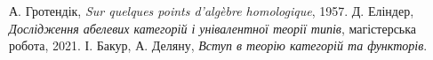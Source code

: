 \documentclass[12pt]{article}
\begin{document}
\begin{thebibliography}{9}
 А. Гротендік, \emph{Sur quelques points d'algèbre homologique}, 1957.
 Д. Еліндер, \emph{Дослідження абелевих категорій і унівалентної теорії типів}, магістерська робота, 2021.
 І. Бакур, А. Деляну, \emph{Вступ в теорію категорій та функторів}.
\end{thebibliography}
\end{document}
